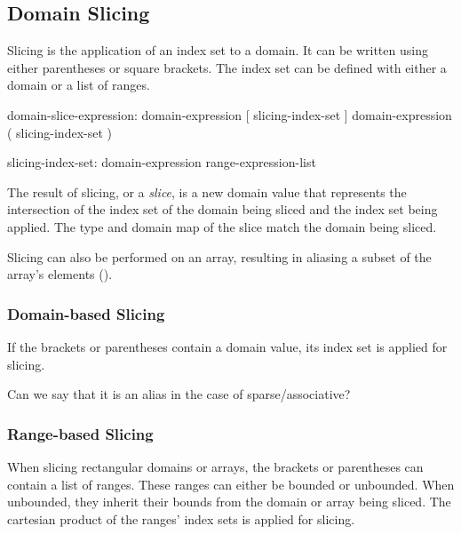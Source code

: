 \subsection{Domain Slicing}
\label{Domain_Slicing}

Slicing is the application of an index set to a domain.
It can be written using either parentheses or square brackets.
The index set can be defined with either a domain or a list of ranges.

\begin{syntax}
domain-slice-expression:
  domain-expression [ slicing-index-set ]
  domain-expression ( slicing-index-set )

slicing-index-set:
  domain-expression
  range-expression-list
\end{syntax}

The result of slicing, or a \emph{slice}, is a new domain value
that represents the intersection of
the index set of the domain being sliced and
the index set being applied.
The type and domain map of the slice match the domain being sliced.

Slicing can also be performed on an array,
resulting in aliasing a subset of the array's elements
().

\subsubsection{Domain-based Slicing}

If the brackets or parentheses contain a domain value,
its index set is applied for slicing.

\begin{openissue}
Can we say that it is an alias in the case of sparse/associative?
\end{openissue}

\subsubsection{Range-based Slicing}
\label{Range_Based_Slicing}
When slicing rectangular domains or arrays, the brackets or parentheses
can contain a list of  ranges.  These ranges can either be bounded
or unbounded.
%
When unbounded, they inherit their bounds from the
domain or array being sliced.
%
The cartesian product of the ranges' index sets is applied for slicing.

